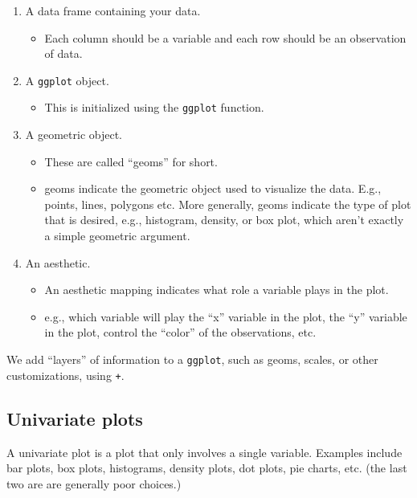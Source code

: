 \documentclass[
]{book}
\providecommand{\tightlist}{%
  \setlength{\itemsep}{0pt}\setlength{\parskip}{0pt}}
\theoremstyle{definition}
\theoremstyle{definition}
\theoremstyle{definition}
\theoremstyle{definition}
\theoremstyle{remark}
\begin{document}
\begin{enumerate}
\def\labelenumi{\arabic{enumi}.}
\tightlist
\item
  A data frame containing your data.

  \begin{itemize}
  \tightlist
  \item
    Each column should be a variable and each row should be an observation of data.
  \end{itemize}
\item
  A \texttt{ggplot} object.

  \begin{itemize}
  \tightlist
  \item
    This is initialized using the \texttt{ggplot} function.
  \end{itemize}
\item
  A geometric object.

  \begin{itemize}
  \tightlist
  \item
    These are called ``geoms'' for short.
  \item
    geoms indicate the geometric object used to visualize the data. E.g., points, lines, polygons etc. More generally, geoms indicate the type of plot that is desired, e.g., histogram, density, or box plot, which aren't exactly a simple geometric argument.
  \end{itemize}
\item
  An aesthetic.

  \begin{itemize}
  \tightlist
  \item
    An aesthetic mapping indicates what role a variable plays in the plot.
  \item
    e.g., which variable will play the ``x'' variable in the plot, the ``y'' variable in the plot, control the ``color'' of the observations, etc.
  \end{itemize}
\end{enumerate}

We add ``layers'' of information to a \texttt{ggplot}, such as geoms, scales, or other customizations, using \texttt{+}.

\hypertarget{univariate-plots}{%
\subsection{Univariate plots}\label{univariate-plots}}

A univariate plot is a plot that only involves a single variable. Examples include bar plots, box plots, histograms, density plots, dot plots, pie charts, etc. (the last two are are generally poor choices.)
\end{document}
